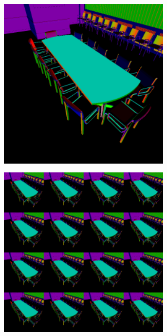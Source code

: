 \begin{figure}[htb]
  \centering
  \begin{subfigure}[b]{0.33\textwidth}
    \centering
    \includegraphics[width=0.95\textwidth]{graphics/interleaved_segovia_1}
    \caption{}
    \label{fig:concept:interleaved_segovia_1}
  \end{subfigure}%
  \begin{subfigure}[b]{0.33\textwidth}
    \centering
    \includegraphics[width=0.95\textwidth]{graphics/interleaved_segovia_2}

\end{subfigure}
\end{figure}
